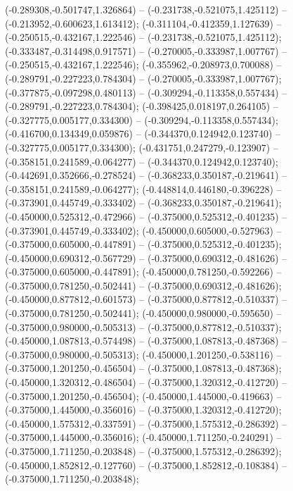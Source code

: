  (-0.289308,-0.501747,1.326864) -- (-0.231738,-0.521075,1.425112) -- (-0.213952,-0.600623,1.613412);
 (-0.311104,-0.412359,1.127639) -- (-0.250515,-0.432167,1.222546) -- (-0.231738,-0.521075,1.425112);
 (-0.333487,-0.314498,0.917571) -- (-0.270005,-0.333987,1.007767) -- (-0.250515,-0.432167,1.222546);
 (-0.355962,-0.208973,0.700088) -- (-0.289791,-0.227223,0.784304) -- (-0.270005,-0.333987,1.007767);
 (-0.377875,-0.097298,0.480113) -- (-0.309294,-0.113358,0.557434) -- (-0.289791,-0.227223,0.784304);
 (-0.398425,0.018197,0.264105) -- (-0.327775,0.005177,0.334300) -- (-0.309294,-0.113358,0.557434);
 (-0.416700,0.134349,0.059876) -- (-0.344370,0.124942,0.123740) -- (-0.327775,0.005177,0.334300);
 (-0.431751,0.247279,-0.123907) -- (-0.358151,0.241589,-0.064277) -- (-0.344370,0.124942,0.123740);
 (-0.442691,0.352666,-0.278524) -- (-0.368233,0.350187,-0.219641) -- (-0.358151,0.241589,-0.064277);
 (-0.448814,0.446180,-0.396228) -- (-0.373901,0.445749,-0.333402) -- (-0.368233,0.350187,-0.219641);
 (-0.450000,0.525312,-0.472966) -- (-0.375000,0.525312,-0.401235) -- (-0.373901,0.445749,-0.333402);
 (-0.450000,0.605000,-0.527963) -- (-0.375000,0.605000,-0.447891) -- (-0.375000,0.525312,-0.401235);
 (-0.450000,0.690312,-0.567729) -- (-0.375000,0.690312,-0.481626) -- (-0.375000,0.605000,-0.447891);
 (-0.450000,0.781250,-0.592266) -- (-0.375000,0.781250,-0.502441) -- (-0.375000,0.690312,-0.481626);
 (-0.450000,0.877812,-0.601573) -- (-0.375000,0.877812,-0.510337) -- (-0.375000,0.781250,-0.502441);
 (-0.450000,0.980000,-0.595650) -- (-0.375000,0.980000,-0.505313) -- (-0.375000,0.877812,-0.510337);
 (-0.450000,1.087813,-0.574498) -- (-0.375000,1.087813,-0.487368) -- (-0.375000,0.980000,-0.505313);
 (-0.450000,1.201250,-0.538116) -- (-0.375000,1.201250,-0.456504) -- (-0.375000,1.087813,-0.487368);
 (-0.450000,1.320312,-0.486504) -- (-0.375000,1.320312,-0.412720) -- (-0.375000,1.201250,-0.456504);
 (-0.450000,1.445000,-0.419663) -- (-0.375000,1.445000,-0.356016) -- (-0.375000,1.320312,-0.412720);
 (-0.450000,1.575312,-0.337591) -- (-0.375000,1.575312,-0.286392) -- (-0.375000,1.445000,-0.356016);
 (-0.450000,1.711250,-0.240291) -- (-0.375000,1.711250,-0.203848) -- (-0.375000,1.575312,-0.286392);
 (-0.450000,1.852812,-0.127760) -- (-0.375000,1.852812,-0.108384) -- (-0.375000,1.711250,-0.203848);
